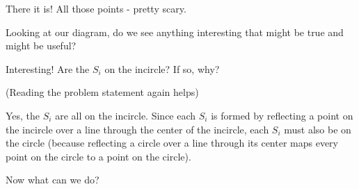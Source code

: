There it is! All those points - pretty scary.

Looking at our diagram, do we see anything interesting that might be true and might be useful?


Interesting! Are the $S_i$ on the incircle?  If so, why?

(Reading the problem statement again helps)








Yes, the $S_i$ are all on the incircle. Since each $S_i$ is formed by reflecting a point on the incircle over a line through the center of the incircle, each $S_i$ must also be on the circle (because reflecting a circle over a line through its center maps every point on the circle to a point on the circle).

Now what can we do?

